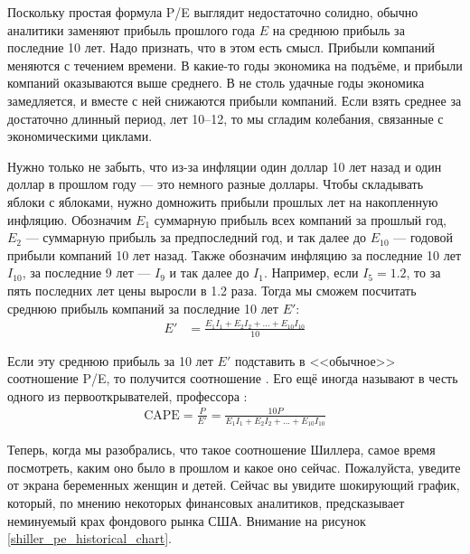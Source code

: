 Поскольку простая формула P/E выглядит недостаточно солидно, обычно аналитики 
заменяют прибыль прошлого года $E$ на среднюю прибыль за последние 10 лет. Надо 
признать, что в этом есть смысл. Прибыли компаний меняются с течением времени. 
В какие-то годы экономика на подъёме, и прибыли компаний оказываются выше 
среднего. В не столь удачные годы экономика замедляется, и вместе с ней 
снижаются прибыли компаний. Если взять среднее за достаточно длинный период, 
лет 10--12, то мы сгладим колебания, связанные с экономическими циклами.

Нужно только не забыть, что из-за инфляции один доллар 10 лет назад и один 
доллар в прошлом году --- это немного разные доллары. Чтобы складывать яблоки с 
яблоками, нужно домножить прибыли прошлых лет на накопленную инфляцию. 
Обозначим $E_{1}$ суммарную прибыль всех компаний за прошлый год, $E_2$ --- 
суммарную прибыль за предпоследний год, и так далее до $E_{10}$ --- годовой 
прибыли компаний 10 лет назад. Также обозначим инфляцию за последние 10 лет 
$I_{10}$, за последние 9 лет --- $I_9$ и так далее до $I_1$. Например, если 
$I_5=1.2$, то за пять последних лет цены выросли в 1.2 раза. Тогда мы сможем 
посчитать среднюю прибыль компаний за последние 10 лет  $E'$:
\begin{align*}
E' &= \frac{E_1I_1 + E_2I_2 + ... + E_{10}I_{10}}{10}
\end{align*}

Если эту среднюю прибыль за 10 лет $E'$ подставить в <<обычное>> соотношение 
P/E, то получится соотношение . Его ещё иногда называют 
 в честь одного из первооткрывателей, 
профессора  \cite{campbell1988dividend}:
\begin{align}
\text{CAPE} = \frac{P}{E'} = \frac{10P}{E_1I_1 + E_2I_2 + ... + E_{10}I_{10}}
\label{cape_formula}
\end{align}

Теперь, когда мы разобрались, что такое соотношение Шиллера, самое время 
посмотреть, каким оно было в прошлом и какое оно сейчас. Пожалуйста, уведите от 
экрана беременных женщин и детей. Сейчас вы увидите шокирующий график, который, 
по мнению некоторых  финансовых аналитиков, предсказывает неминуемый крах 
фондового рынка США. Внимание на рисунок \ref{shiller_pe_historical_chart}.



\newcommand{\dotWithNumber}[5] {
        \node[
            circle,
            fill,
            inner sep = 2pt,
            color = #3
        ]
        at (axis cs: #1, #2) {};
        
        \node[
            anchor=#5
        ]
        at (axis cs: #1, #2)
        {#4};
}



